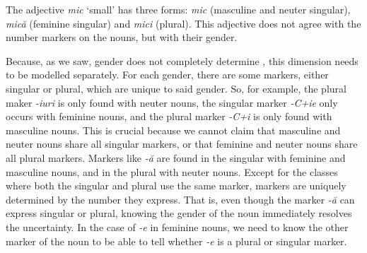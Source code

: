 The adjective \textit{mic} `small' has three forms: \textit{mic} (masculine and neuter singular), \textit{mică} (feminine singular) and \textit{mici} (plural). This adjective does not agree with the number markers on the nouns, but with their gender.

Because, as we saw, gender does not completely determine , this dimension needs to be modelled separately. For each gender, there are some markers, either singular or plural, which are unique to said gender. So, for example, the plural maker \textit{-iuri} is only found with neuter nouns, the singular marker \textit{-C+ie} only occurs with feminine nouns, and the plural marker \textit{-C+i} is only found with masculine nouns. This is crucial because we cannot claim that masculine and neuter nouns share all singular markers, or that feminine and neuter nouns share all plural markers. Markers like \textit{-ă} are found in the singular with feminine and masculine nouns, and in the plural with neuter nouns. Except for the classes where both the singular and plural use the same marker, markers are uniquely determined by the number they express. That is, even though the marker \textit{-ă} can express singular or plural, knowing the gender of the noun immediately resolves the uncertainty. In the case of \textit{-e} in feminine nouns, we need to know the other marker of the noun to be able to tell whether \textit{-e} is a plural or singular marker.


